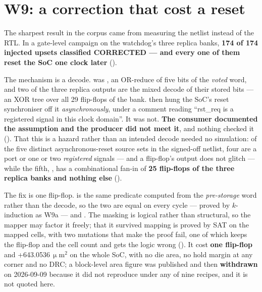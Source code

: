 \section{W9: a correction that cost a reset}
\label{sec:harden-w9}

The sharpest result in the corpus came from measuring the netlist
instead of the RTL. In a gate-level campaign on the watchdog's three
replica banks, \textbf{174 of 174 injected upsets classified CORRECTED
--- and every one of them reset the SoC one clock later}
().

The mechanism is a decode.  was
, an OR-reduce of five bits of the \emph{voted}
word, and two of the three replica outputs are the mixed decode of their
stored bits --- an XOR tree over all 29 flip-flops of the bank.
 then hung the SoC's reset synchroniser off it
\emph{asynchronously}, under a comment reading ``rst\_req is a
registered signal in this clock domain''. It was not. \textbf{The
consumer documented the assumption and the producer did not meet it},
and nothing checked it (). That this is a hazard
rather than an intended decode needed no simulation: of the five
distinct asynchronous-reset source sets in the signed-off netlist, four
are a port or one or two \emph{registered} signals --- and a flip-flop's
output does not glitch --- while the fifth, , has a
combinational fan-in of \textbf{25 flip-flops of the three replica banks
and nothing else} ().

The fix is one flip-flop.  is the same predicate
computed from the \emph{pre-storage} word rather than the decode, so the
two are equal on every cycle --- proved by $k$-induction as W9a --- and
. The masking is
logical rather than structural, so the mapper may factor it freely; that
it survived mapping is proved by SAT on the mapped cells, with two
mutations that make the proof fail, one of which keeps the flip-flop and
the cell count and gets the logic wrong (). It
cost \textbf{one flip-flop} and +643.0536\,$\upmu$m$^2$ on
the whole SoC, with no die area, no hold margin at any corner and no
DRC; a block-level area figure was published and then
\textbf{withdrawn} on 2026-09-09 because it did not reproduce under any
of nine recipes, and it is not quoted here.


